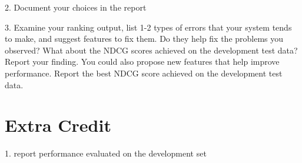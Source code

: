 2. Document your choices in the report

3. 
Examine your ranking output, list 1-2 types of errors that your system tends
to make, and suggest features to fix them. Do they help fix the problems you
observed? What about the NDCG scores achieved on the development test data?
Report your finding.
You could also propose new features that help improve performance. Report the
best NDCG score achieved on the development test data.

\section{Extra Credit}
1. report performance evaluated on the development
set



